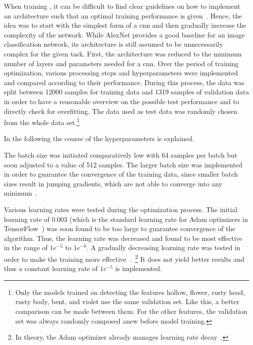 When training , it can be difficult to find clear guidelines on how to implement an architecture such that an optimal training performance is given~\citep{heaton2015aifh,geron2019hands,bettilyon2018classify}. Hence, the idea was to start with the simplest form of a \acrshort{cnn} and then gradually increase the complexity of the network. While AlexNet provides a good baseline for an image classification network, its architecture is still assumed to be unnecessarily complex for the given task. First, the architecture was reduced to the minimum number of layers and parameters needed for a \acrshort{cnn}. Over the period of training optimization, various processing steps and hyperparameters were implemented and compared according to their performance. During this process, the data was split between 12000 samples for training data and 1319 samples of validation data in order to have a reasonable overview on the possible test performance and to directly check for overfitting. The data used as test data was randomly chosen from the whole data set.\footnote{Only the models trained on detecting the features hollow, flower, rusty head, rusty body, bent, and violet use the same validation set. Like this, a better comparison can be made between them. For the other features, the validation set was always randomly composed anew before model training.}

\bigskip
In the following the course of the hyperparameters is explained.
 
The batch size was initiated comparatively low with 64 samples per batch but soon adjusted to a value of 512 samples. The larger batch size was implemented in order to guarantee the convergence of the training data, since smaller batch sizes result in jumping gradients, which are not able to converge into any minimum~\citep{bengio2012practical}.
 
Various learning rates were tested during the optimization process. The initial learning rate of 0.003 (which is the standard learning rate for Adam optimizers in TensorFlow~\citep{kingma2014adam,geron2019hands}) was soon found to be too large to guarantee convergence of the algorithm. Thus, the learning rate was decreased and found to be most effective in the range of \(1e^{-5}\) to \(1e^{-8}\). A gradually decreasing learning rate was tested in order to make the training more effective~\citep{bengio2012practical}.~\footnote{In theory, the Adam optimizer already manages learning rate decay~\citep{kingma2014adam}.} It does not yield better results and thus a constant learning rate of \(1e^{-5}\) is implemented.
 
